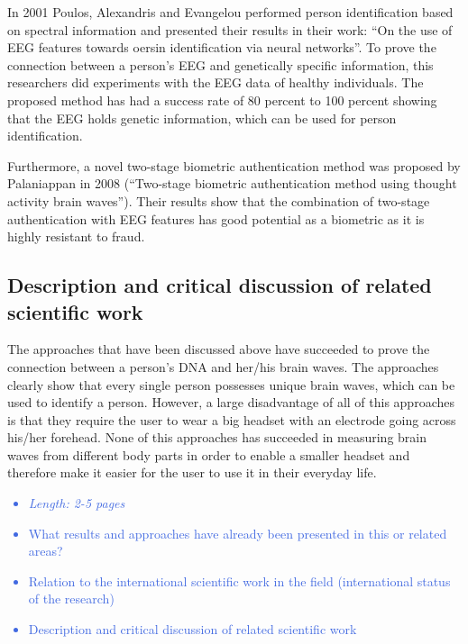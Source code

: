 \documentclass[a4paper,11pt]{article}
\providecommand*{\note}[1]{\small \textcolor{RoyalBlue}{\begin{minipage}{\textwidth}{#1}\end{minipage}}}
\begin{document}
In 2001 Poulos, Alexandris and Evangelou performed person identification based on spectral information and presented their results in their work: “On the use of EEG features towards oersin identification via neural networks”. To prove the connection between a person's EEG and genetically specific information, this researchers did experiments with the EEG data of healthy individuals. The proposed method has had a success rate of 80 percent to 100 percent showing that the EEG holds genetic information, which can be used for person identification.


Furthermore, a novel two-stage biometric authentication method was proposed by Palaniappan in 2008 (“Two-stage biometric authentication method using thought activity brain waves”). Their results show that the combination of two-stage authentication with EEG features has good potential as a biometric as it is highly resistant to fraud.

\subsection{Description and critical discussion of related scientific work}
The approaches that have been discussed above have succeeded to prove the connection between a person's DNA and her/his brain waves. The approaches clearly show that every single person possesses unique brain waves, which can be used to identify a person. However, a large disadvantage of all of this approaches is that they require the user to wear a big headset with an electrode going across his/her forehead. None of this approaches has succeeded in measuring brain waves from different body parts in order to enable a smaller headset and therefore make it easier for the user to use it in their everyday life.


\note{
\begin{itemize}
\item {\em Length: 2-5 pages}
\item What results and approaches have already been presented in this or related areas?
\item Relation to the international scientific work in the field (international status of the research)
\item Description and critical discussion of related scientific work
\end{itemize}
}
\end{document}
